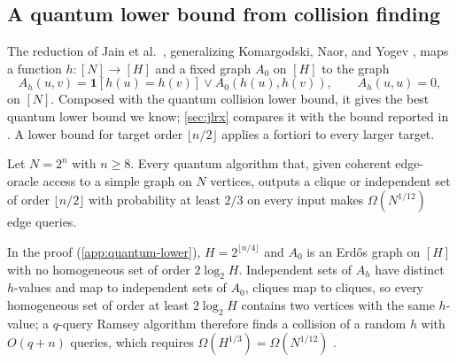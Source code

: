 \subsection{A quantum lower bound from collision finding}
\label{sec:quantum-lower}

The reduction of Jain et al.\ \cite[Lemma~III.1]{JainLiRobereXun2024},
generalizing Komargodski, Naor, and Yogev
\cite{KomargodskiNaorYogev2019}, maps a function $h\colon[N]\to[H]$ and a
fixed graph $A_0$ on $[H]$ to the graph
\begin{equation}\label{eq:product-graph}
 A_h(u,v)=\mathbf 1[h(u)=h(v)]\lor A_0(h(u),h(v)),
 \qquad A_h(u,u)=0,
\end{equation}
on $[N]$.  Composed with the quantum collision lower bound, it gives the
best quantum lower bound we know; \cref{sec:jlrx} compares it with the
bound reported in \cite{JainLiRobereXun2024}.  A lower bound for target
order $\lfloor n/2\rfloor$ applies a fortiori to every larger target.

\begin{proposition}
\label{prop:quantum-lower}
Let $N=2^n$ with $n\ge8$.  Every quantum algorithm that, given coherent
edge-oracle access to a simple graph on $N$ vertices, outputs a clique or
independent set of order $\lfloor n/2\rfloor$ with probability at least
$2/3$ on every input makes $\Omega(N^{1/12})$ edge queries.
\end{proposition}

In the proof (\cref{app:quantum-lower}), $H=2^{\lfloor n/4\rfloor}$ and
$A_0$ is an Erd\H{o}s graph on $[H]$ with no homogeneous set of order
$2\log_2H$.  Independent sets of $A_h$ have distinct $h$-values and map to
independent sets of $A_0$, cliques map to cliques, so every homogeneous set
of order at least $2\log_2H$ contains two vertices with the same
$h$-value; a $q$-query Ramsey algorithm therefore finds a collision of a
random $h$ with $O(q+n)$ queries, which requires
$\Omega(H^{1/3})=\Omega(N^{1/12})$ \cite{Zhandry2015}.
